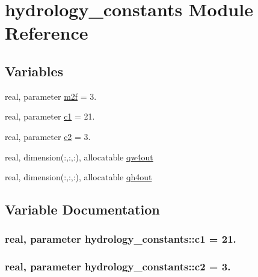 \hypertarget{namespacehydrology__constants}{}\section{hydrology\+\_\+constants Module Reference}
\label{namespacehydrology__constants}
\subsection*{Variables}
\begin{DoxyCompactItemize}
\item 
real, parameter \hyperlink{namespacehydrology__constants_ab490db8c3db1149de2c3a999ca405462}{m2f} = 3.
\item 
real, parameter \hyperlink{namespacehydrology__constants_aab37efe722e2cb3021d692662a4f71be}{c1} = 21.
\item 
real, parameter \hyperlink{namespacehydrology__constants_af41d19dbcc0f506fe98fcd9d081ee8d9}{c2} = 3.
\item 
real, dimension(\+:,\+:,\+:), allocatable \hyperlink{namespacehydrology__constants_a4a968142e8621f39c2e739983340bb25}{qw4out}
\item 
real, dimension(\+:,\+:,\+:), allocatable \hyperlink{namespacehydrology__constants_aab3e1ed337a2f4bb8ac1ae647b9ebd65}{qh4out}
\end{DoxyCompactItemize}


\subsection{Variable Documentation}
\subsubsection[{\texorpdfstring{c1}{c1}}]{\setlength{\rightskip}{0pt plus 5cm}real, parameter hydrology\+\_\+constants\+::c1 = 21.}\hypertarget{namespacehydrology__constants_aab37efe722e2cb3021d692662a4f71be}{}\label{namespacehydrology__constants_aab37efe722e2cb3021d692662a4f71be}
\subsubsection[{\texorpdfstring{c2}{c2}}]{\setlength{\rightskip}{0pt plus 5cm}real, parameter hydrology\+\_\+constants\+::c2 = 3.}\hypertarget{namespacehydrology__constants_af41d19dbcc0f506fe98fcd9d081ee8d9}{}\label{namespacehydrology__constants_af41d19dbcc0f506fe98fcd9d081ee8d9}

